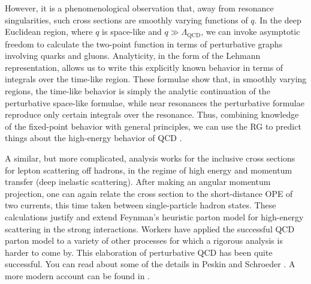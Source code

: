 However, it is a phenomenological observation that, away from resonance
singularities, such cross sections are smoothly varying functions of $q$. In
the deep Euclidean region, where $q$ is space-like and $q\gg\Lambda_{\mathrm{QCD}}$,
we can invoke asymptotic freedom to calculate the two-point function in terms
of perturbative graphs involving quarks and gluons. Analyticity, in the form of
the Lehmann representation, allows us to write this explicitly known behavior
in terms of integrals over the time-like region. These formulae show that, in
smoothly varying regions, the time-like behavior is simply the analytic
continuation of the perturbative space-like formulae, while near resonances the
perturbative formulae reproduce only certain integrals over the resonance.
Thus, combining knowledge of the fixed-point behavior with general principles,
we can use the RG to predict things about the high-energy behavior of QCD
\cite{banks-ref-32}.

A similar, but more complicated, analysis works for the inclusive cross
sections for lepton scattering off hadrons, in the regime of high energy and
momentum transfer (deep inelastic scattering). After making an angular momentum
projection, one can again relate the cross section to the short-distance OPE of
two currents, this time taken between single-particle hadron states. These
calculations justify and extend Feynman's heuristic parton model for high-energy
scattering in the strong interactions. Workers have applied the successful QCD
parton model to a variety of other processes for which a rigorous analysis is
harder to come by. This elaboration of perturbative QCD has been quite
successful. You can read about some of the details in Peskin and Schroeder
\cite{banks-ref-33}. A more modern account can be found in \cite{banks-ref-124}.
